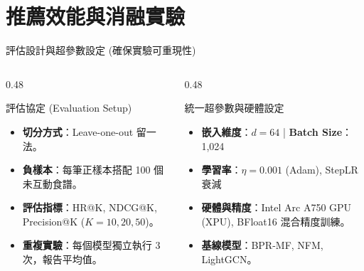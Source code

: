 \documentclass[aspectratio=169, 10pt]{beamer}
\begin{document}
\section{推薦效能與消融實驗}

\begin{frame}{評估設計與超參數設定 (確保實驗可重現性)}
  \begin{columns}[T]
    \begin{column}{0.48\textwidth}
      \begin{block}{評估協定 (Evaluation Setup)}
        \begin{itemize}
          \item \textbf{切分方式}：Leave-one-out 留一法。
          \item \textbf{負樣本}：每筆正樣本搭配 100 個未互動食譜。
          \item \textbf{評估指標}：HR@K, NDCG@K, Precision@K ($K=10, 20, 50$)。
          \item \textbf{重複實驗}：每個模型獨立執行 3 次，報告平均值。
        \end{itemize}
      \end{block}
    \end{column}
    \begin{column}{0.48\textwidth}
      \begin{block}{統一超參數與硬體設定}
        \begin{itemize}
          \item \textbf{嵌入維度}：$d=64$ | \textbf{Batch Size}：1,024
          \item \textbf{學習率}：$\eta=0.001$ (Adam), StepLR 衰減
          \item \textbf{硬體與精度}：Intel Arc A750 GPU (XPU), BFloat16 混合精度訓練。
          \item \textbf{基線模型}：BPR-MF, NFM, LightGCN。
        \end{itemize}
      \end{block}
    \end{column}
  \end{columns}
\end{frame}
\end{document}
